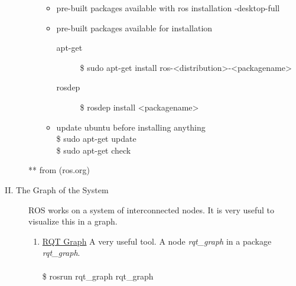 \documentclass[12pt]{article}
\begin{document}
\begin{description}
\begin{enumerate}
\begin{itemize}
                    \item pre-built packages available with ros installation {\selectfont  \hspace{5mm} -desktop-full}
                    \item pre-built packages available for installation \\
                    \begin{description}
                        \item[apt-get] {\selectfont  \hspace{1mm} \$ sudo apt-get install ros-<distribution>-<packagename> } 
                        \item[rosdep]{\selectfont  \hspace{1mm} \$ rosdep install <packagename> } \\
                    \end{description}
                    \item update ubuntu before installing anything \\
                    {\selectfont  \hspace{2mm} \$ sudo apt-get update } \\
                    {\selectfont  \hspace{2mm} \$ sudo apt-get check }                
                \end{itemize}            

                
                
    \end{enumerate}
    ** from (ros.org)
    \newpage
    
    \item [II. The Graph of the System] ROS works on a system of interconnected nodes. It is very useful to visualize this in a graph.\\
        \begin{enumerate}   
            
            \item \href{http://wiki.ros.org/rqt_graph}{RQT Graph} A very useful tool. A node {\it rqt\_graph} in a package {\it rqt\_graph}. \\\\
                    {\selectfont  \hspace{5mm} \$ rosrun rqt\_graph rqt\_graph}\\
            

\end{enumerate}
\end{description}
\end{document}
